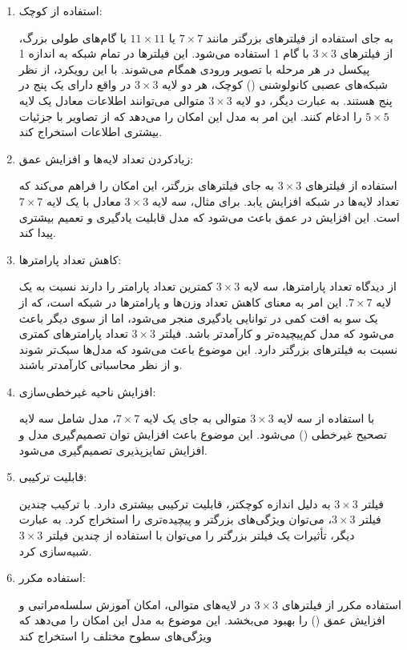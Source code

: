 \documentclass{article}
\begin{document}
\begin{enumerate}

\item    استفاده از  کوچک:

        به جای استفاده از فیلترهای بزرگتر مانند $7\times7$ یا $11\times11$ با گام‌های طولی بزرگ، از فیلترهای $3\times3$ با گام 1 استفاده می‌شود. این فیلترها در تمام شبکه به اندازه 1 پیکسل در هر مرحله با تصویر ورودی همگام می‌شوند.
        با این رویکرد، از نظر شبکه‌های عصبی کانولوشنی () کوچک، هر دو لایه $3\times3$ در واقع دارای یک  پنج در پنج هستند. به عبارت دیگر، دو لایه $3\times3$ متوالی می‌توانند اطلاعات معادل یک لایه $5\times5$ را ادغام کنند. این امر به مدل این امکان را می‌دهد که از تصاویر با جزئیات بیشتری اطلاعات استخراج کند.

\item    زیادکردن تعداد لایه‌ها و افزایش عمق:

        استفاده از فیلترهای $3\times3$ به جای فیلترهای بزرگتر، این امکان را فراهم می‌کند که تعداد لایه‌ها در شبکه افزایش یابد. برای مثال، سه لایه $3\times3$ معادل با یک لایه $7\times7$ است. این افزایش در عمق باعث می‌شود که مدل قابلیت یادگیری و تعمیم بیشتری پیدا کند.

\item    کاهش تعداد پارامترها:

        از دیدگاه تعداد پارامترها، سه لایه $3\times3$ کمترین تعداد پارامتر را دارند نسبت به یک لایه $7\times7$. این امر به معنای کاهش تعداد وزن‌ها و پارامترها در شبکه است، که از یک سو به افت کمی در توانایی یادگیری منجر می‌شود، اما از سوی دیگر باعث می‌شود که مدل کم‌پیچیده‌تر و کارآمدتر باشد. فیلتر $3\times3$ تعداد پارامترهای کمتری نسبت به فیلترهای بزرگتر دارد. این موضوع باعث می‌شود که مدل‌ها سبک‌تر شوند و از نظر محاسباتی کارآمدتر باشند.

\item    افزایش ناحیه غیرخطی‌سازی:

        با استفاده از سه لایه $3\times3$ متوالی به جای یک لایه $7\times7$، مدل شامل سه لایه تصحیح غیرخطی () می‌شود. این موضوع باعث افزایش توان تصمیم‌گیری مدل و افزایش تمایز‌پذیری تصمیم‌گیری می‌شود.

\item قابلیت ترکیبی:

    فیلتر $3\times3$ به دلیل اندازه کوچکتر، قابلیت ترکیبی بیشتری دارد. با ترکیب چندین فیلتر $3\times3$، می‌توان ویژگی‌های بزرگتر و پیچیده‌تری را استخراج کرد. به عبارت دیگر، تأثیرات یک فیلتر بزرگتر را می‌توان با استفاده از چندین فیلتر $3\times3$ شبیه‌سازی کرد.


\item استفاده مکرر:

    استفاده مکرر از فیلترهای $3\times3$ در لایه‌های متوالی، امکان آموزش سلسله‌مراتبی و افزایش عمق () را بهبود می‌بخشد. این موضوع به مدل این امکان را می‌دهد که ویژگی‌های سطوح مختلف را استخراج کند

\end{enumerate}
\end{document}
